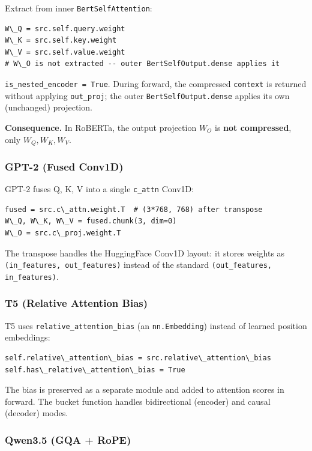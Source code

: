 Extract from inner \texttt{BertSelfAttention}:

\begin{lstlisting}
W\_Q = src.self.query.weight
W\_K = src.self.key.weight
W\_V = src.self.value.weight
# W\_O is not extracted -- outer BertSelfOutput.dense applies it
\end{lstlisting}

\texttt{is\_nested\_encoder = True}. During forward, the compressed \texttt{context} is 
returned without applying \texttt{out\_proj}; the outer \texttt{BertSelfOutput.dense} 
applies its own (unchanged) projection.

\textbf{Consequence.} In RoBERTa, the output projection $W_O$ is \textbf{not compressed}, 
only $W_Q, W_K, W_V$.

\subsubsection{GPT-2 (Fused Conv1D)}

GPT-2 fuses Q, K, V into a single \texttt{c\_attn} Conv1D:

\begin{lstlisting}
fused = src.c\_attn.weight.T  # (3*768, 768) after transpose
W\_Q, W\_K, W\_V = fused.chunk(3, dim=0)
W\_O = src.c\_proj.weight.T
\end{lstlisting}

The transpose handles the HuggingFace Conv1D layout: it stores weights as 
\texttt{(in\_features, out\_features)} instead of the standard \texttt{(out\_features, in\_features)}.

\subsubsection{T5 (Relative Attention Bias)}

T5 uses \texttt{relative\_attention\_bias} (an \texttt{nn.Embedding}) instead of learned 
position embeddings:

\begin{lstlisting}
self.relative\_attention\_bias = src.relative\_attention\_bias
self.has\_relative\_attention\_bias = True
\end{lstlisting}

The bias is preserved as a separate module and added to attention scores 
in forward. The bucket function handles bidirectional (encoder) and causal 
(decoder) modes.

\subsubsection{Qwen3.5 (GQA + RoPE)}

